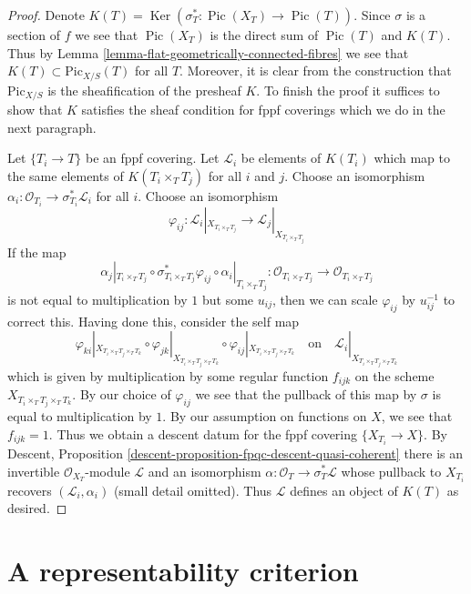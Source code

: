 \documentclass{stacks-project}
\theoremstyle{plain}
\theoremstyle{definition}
\theoremstyle{remark}
\numberwithin{equation}{subsection}
\def\Ker{\mathop{\mathrm{Ker}}}
\def\Pic{\mathop{\mathrm{Pic}}\nolimits}
\def\Picardfunctor{\mathrm{Pic}}
\begin{document}
\begin{proof}
Denote $K(T) = \Ker(\sigma_T^* : \Pic(X_T) \to \Pic(T))$.
Since $\sigma$ is a section of $f$ we see that $\Pic(X_T)$ is the direct
sum of $\Pic(T)$ and $K(T)$.
Thus by Lemma \ref{lemma-flat-geometrically-connected-fibres} we see that
$K(T) \subset \Picardfunctor_{X/S}(T)$ for all $T$. Moreover, it is clear
from the construction that $\Picardfunctor_{X/S}$ is the sheafification
of the presheaf $K$. To finish the proof it suffices to show that
$K$ satisfies the sheaf condition for fppf coverings which we do
in the next paragraph.

\medskip\noindent
Let $\{T_i \to T\}$ be an fppf covering. Let $\mathcal{L}_i$ be
elements of $K(T_i)$ which map to the same elements of $K(T_i \times_T T_j)$
for all $i$ and $j$. Choose an isomorphism
$\alpha_i : \mathcal{O}_{T_i} \to \sigma_{T_i}^*\mathcal{L}_i$
for all $i$. Choose an isomorphism
$$
\varphi_{ij} :
\mathcal{L}_i|_{X_{T_i \times_T T_j}}
\longrightarrow
\mathcal{L}_j|_{X_{T_i \times_T T_j}}
$$
If the map
$$
\alpha_j|_{T_i \times_T T_j} \circ
\sigma_{T_i \times_T T_j}^*\varphi_{ij} \circ
\alpha_i|_{T_i \times_T T_j} :
\mathcal{O}_{T_i \times_T T_j} \to \mathcal{O}_{T_i \times_T T_j}
$$
is not equal to multiplication by $1$ but some $u_{ij}$, then we can scale
$\varphi_{ij}$ by $u_{ij}^{-1}$ to correct this. Having done this, consider
the self map
$$
\varphi_{ki}|_{X_{T_i \times_T T_j \times_T T_k}} \circ
\varphi_{jk}|_{X_{T_i \times_T T_j \times_T T_k}} \circ
\varphi_{ij}|_{X_{T_i \times_T T_j \times_T T_k}}
\quad\text{on}\quad
\mathcal{L}_i|_{X_{T_i \times_T T_j \times_T T_k}}
$$
which is given by multiplication by some regular function $f_{ijk}$
on the scheme $X_{T_i \times_T T_j \times_T T_k}$.
By our choice of $\varphi_{ij}$ we see that the pullback of
this map by $\sigma$ is equal to multiplication by $1$. By
our assumption on functions on $X$, we see that $f_{ijk} = 1$.
Thus we obtain a descent datum for the fppf covering
$\{X_{T_i} \to X\}$. By
Descent, Proposition \ref{descent-proposition-fpqc-descent-quasi-coherent}
there is an invertible $\mathcal{O}_{X_T}$-module $\mathcal{L}$
and an isomorphism $\alpha : \mathcal{O}_T \to \sigma_T^*\mathcal{L}$
whose pullback to $X_{T_i}$ recovers $(\mathcal{L}_i, \alpha_i)$
(small detail omitted). Thus $\mathcal{L}$ defines an object
of $K(T)$ as desired.
\end{proof}



\section{A representability criterion}
\label{section-representability}
\end{document}
